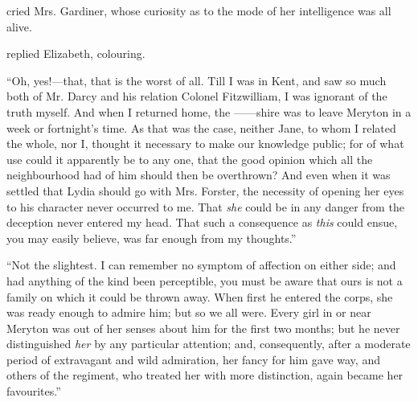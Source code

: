  cried Mrs. Gardiner, whose curiosity as to the mode of her intelligence was all alive.

 replied Elizabeth, colouring. 


“Oh, yes!---that, that is the worst of all. Till I was in Kent, and saw so much both of Mr. Darcy and his relation Colonel Fitzwilliam, I was ignorant of the truth myself. And when I returned home, the ------shire was to leave Meryton in a week or fortnight's time. As that was the case, neither Jane, to whom I related the whole, nor I, thought it necessary to make our knowledge public; for of what use could it apparently be to any one, that the good opinion which all the neighbourhood had of him should then be overthrown? And even when it was settled that Lydia should go with Mrs. Forster, the necessity of opening her eyes to his character never occurred to me. That {\em she} could be in any danger from the deception never entered my head. That such a consequence as {\em this} could ensue, you may easily believe, was far enough from my thoughts.”


“Not the slightest. I can remember no symptom of affection on either side; and had anything of the kind been perceptible, you must be aware that ours is not a family on which it could be thrown away. When first he entered the corps, she was ready enough to admire him; but so we all were. Every girl in or near Meryton was out of her senses about him for the first two months; but he never distinguished {\em her} by any particular attention; and, consequently, after a moderate period of extravagant and wild admiration, her fancy for him gave way, and others of the regiment, who treated her with more distinction, again became her favourites.”


